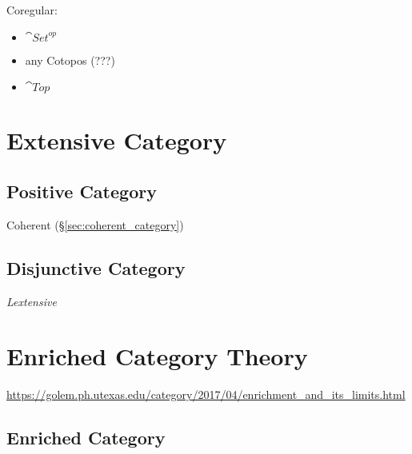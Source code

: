 Coregular:

\begin{itemize}
  \item $\cat{Set}^{op}$
  \item any Cotopos (???)
  \item $\cat{Top}$
\end{itemize}



\section{Extensive Category}\label{sec:extensive_category}

\subsection{Positive Category}\label{sec:positive_category}

Coherent (\S\ref{sec:coherent_category})



\subsection{Disjunctive Category}\label{sec:disjunctive_category}

\emph{Lextensive}



\section{Enriched Category Theory}\label{sec:enriched_category_theory}

\url{https://golem.ph.utexas.edu/category/2017/04/enrichment_and_its_limits.html}



\subsection{Enriched Category}\label{sec:enriched_category}

